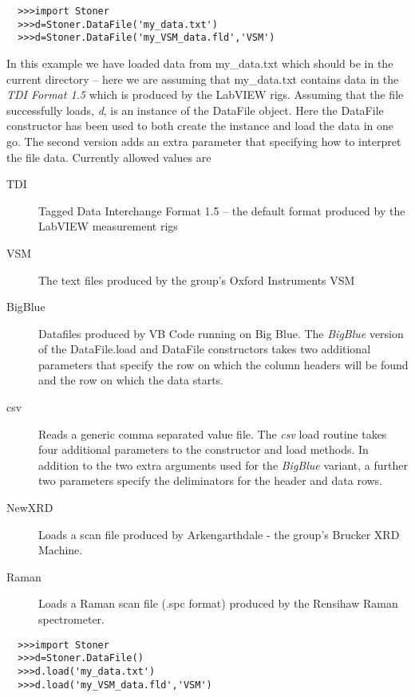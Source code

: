 \documentclass[a4paper,11pt]{scrartcl}
\begin{document}
\begin{verbatim}
  >>>import Stoner
  >>>d=Stoner.DataFile('my_data.txt')
  >>>d=Stoner.DataFile('my_VSM_data.fld','VSM')
\end{verbatim}

In this example we have loaded data from my\_data.txt which should be in the current directory -- here we are assuming that my\_data.txt contains data in the \textit{TDI Format 1.5} which is produced by the LabVIEW rigs. Assuming that the file successfully loads, \textit{d}, is an instance of the DataFile object. Here the DataFile constructor has been used to both create the instance and load the data in one go. The second version adds an extra parameter that specifying how to interpret the file data. Currently allowed values are 

\begin{description}
\item[TDI] Tagged Data Interchange Format 1.5 -- the default format produced by the LabVIEW measurement rigs
\item[VSM] The text files produced by the group's Oxford Instruments VSM
\item[BigBlue] Datafiles produced by VB Code running on Big Blue. The \textit{BigBlue} version of the DataFile.load and DataFile constructors takes two additional parameters that specify the row on which the column headers will be found and the row on which the data starts.
\item[csv] Reads a generic comma separated value file. The \textit{csv} load routine takes four additional parameters to the constructor and load methods. In addition to the two extra arguments used for the \textit{BigBlue} variant, a further two parameters specify the deliminators for the header and data rows.
\item[NewXRD] Loads a scan file produced by Arkengarthdale - the group's Brucker XRD Machine.
\item[Raman] Loads a Raman scan file (.spc format) produced by the Rensihaw Raman spectrometer.
\end{description}

\begin{verbatim}
  >>>import Stoner
  >>>d=Stoner.DataFile()
  >>>d.load('my_data.txt')
  >>>d.load('my_VSM_data.fld','VSM')
\end{verbatim}

\end{document}
